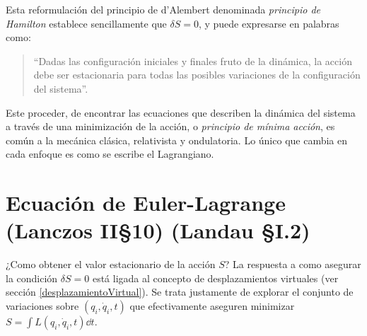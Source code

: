 \documentclass[12pt,spanish,a4paper]{article}
\begin{document}
Esta reformulación del principio de d'Alembert denominada \emph{principio de Hamilton} establece sencillamente que \(\delta S= 0\), y puede expresarse en palabras como:
\begin{quote}
``Dadas las configuración iniciales y finales fruto de la dinámica, la acción debe ser estacionaria para todas las posibles variaciones de la configuración del sistema''. 
\end{quote}

Este proceder, de encontrar las ecuaciones que describen la dinámica del sistema a través de una minimización de la acción, o \emph{principio de mínima acción}, es común a la mecánica clásica, relativista y ondulatoria.
Lo único que cambia en cada enfoque es como se escribe el Lagrangiano.


\section{Ecuación de Euler-Lagrange {\small (Lanczos II\S10) (Landau \S I.2)} }\label{EulerLagrange} %
¿Como obtener el valor estacionario de la acción \(S\)?
La respuesta a como asegurar la condición \(\delta S= 0\) está ligada al concepto de desplazamientos virtuales (ver sección \ref{desplazamientoVirtual}).
Se trata justamente de explorar el conjunto de variaciones sobre \((q_i, \dot{q}_i, t)\) que efectivamente aseguren minimizar \(S= \int L(q_i, \dot{q}_i, t) \dd t\).
\end{document}
